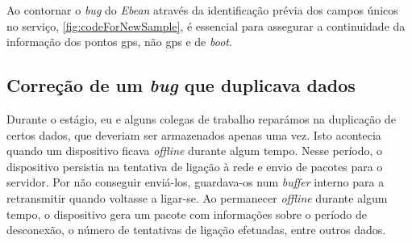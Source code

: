 Ao contornar o \textit{bug} do \textit{Ebean} através da identificação prévia dos campos únicos no serviço, \autoref{fig:codeForNewSample}, é essencial para assegurar a continuidade da informação dos pontos \acs{gps}, não \acs{gps} e de \textit{boot}.

\clearpage
\subsection{Correção de um \textit{bug} que duplicava dados} %



Durante o estágio, eu e alguns colegas de trabalho reparámos na duplicação de certos dados, que deveriam ser armazenados apenas uma vez. Isto acontecia quando um dispositivo ficava \textit{offline} durante algum tempo. Nesse período, o dispositivo persistia na tentativa de ligação à rede e envio de pacotes para o servidor. Por não conseguir enviá-los, guardava-os num \textit{buffer} interno para a retransmitir quando voltasse a ligar-se. Ao permanecer \textit{offline} durante algum tempo, o dispositivo gera um pacote com informações sobre o período de desconexão, o número de tentativas de ligação efetuadas, entre outros dados.

